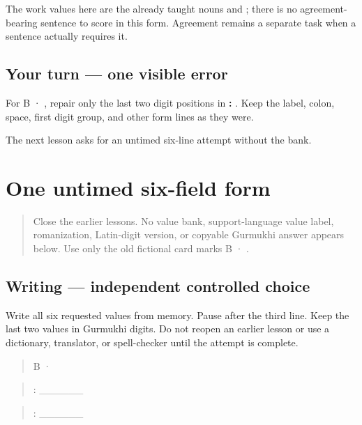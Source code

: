 The work values here are the already taught nouns \textbf{} and \textbf{}; there is no agreement-bearing sentence to score in this form. Agreement remains a separate task when a sentence actually requires it.

\subsection*{Your turn — one visible error}
For B · , repair only the last two digit positions in \textbf{:  }. Keep the label, colon, space, first digit group, and other form lines as they were.

\begin{tcolorbox}[breakable,colback=teal!4,colframe=teal!35!black,title={Before you move on}]
The next lesson asks for an untimed six-line attempt without the bank.
\end{tcolorbox}
\section[\texorpdfstring{\pa{ਨਾਂ}: · \pa{ਭਾਸ਼ਾ} … (independent …)}{ਨਾਂ: · ਭਾਸ਼ਾ … (independent …)}]{One untimed six-field form}

\label{lesson:PA-W11-form-six-no-model}



\begin{quote}
Close the earlier lessons. No value bank, support-language value label, romanization, Latin-digit version, or copyable Gurmukhi answer appears below. Use only the old fictional card marks B · .
\end{quote}

\subsection*{Writing — independent controlled choice}
Write all six requested values from memory. Pause after the third line. Keep the last two values in Gurmukhi digits. Do not reopen an earlier lesson or use a dictionary, translator, or spell-checker until the attempt is complete.

\begin{quote}
B · 
\end{quote}

\begin{quote}
: \_\_\_\_\_\_
\end{quote}

\begin{quote}
: \_\_\_\_\_\_
\end{quote}


